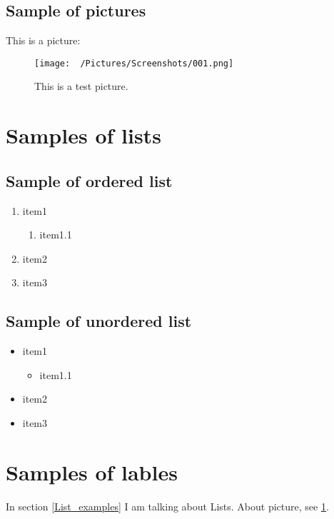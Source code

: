 
\subsection{Sample of pictures}
This is a picture:
\begin{figure}[!hbtp]
    \begin{center}
    \texttt{[image: ~/Pictures/Screenshots/001.png]}
    \end{center}
    \caption{This is a test picture.\label{Picture_example}}
\end{figure}


\section{Samples of lists\label{List_examples}}

\subsection{Sample of ordered list}
\begin{enumerate}
    \item item1
        \begin{enumerate}
            \item item1.1
        \end{enumerate}
    \item item2
    \item item3
\end{enumerate}

\subsection{Sample of unordered list}
\begin{itemize}
    \item item1
        \begin{itemize}
            \item item1.1
        \end{itemize}
    \item item2
    \item item3
\end{itemize}

\section{Samples of lables}
In section \ref{List_examples} I am talking about Lists. About picture, see \ref{Picture_example}.

